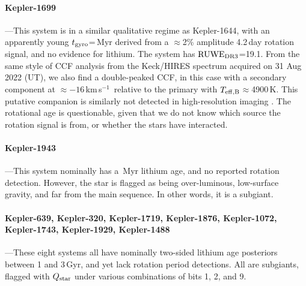 \documentclass[11pt,twocolumn,tighten]{aastex63}
\newcommand{\kms}{{km\,s$^{-1}$}}
\begin{document}
\paragraph{Kepler-1699}---This system is in a similar qualitative
regime as Kepler-1644, with an apparently young $t_{\rm
gyro}$=\kepsixteenninenine\,Myr derived from a $\approx$2\% amplitude
4.2\,day rotation signal, and no evidence for lithium.  The system has
${\rm RUWE}_{\rm DR3}$=19.1.  From the same style of CCF analysis from
the Keck/HIRES spectrum acquired on 31 Aug 2022 (UT), we also find a
double-peaked CCF, in this case with a secondary component at
$\approx$$-16$\,\kms\ relative to the primary with $T_{\rm
eff,B}$$\approx$4900\,K.  This putative companion is similarly not
detected in high-resolution imaging \citep{2017AJ....153...66Z}.  The
rotational age is questionable, given that we do not know which
source the rotation signal is from, or whether the stars have
interacted.

\paragraph{Kepler-1943}---This system nominally has a
\kepnineteenfourthree\,Myr lithium age, and no reported rotation
detection.  However, the star is flagged as being over-luminous,
low-surface gravity, and far from the main sequence.  In other words,
it is a subgiant.

\paragraph{Kepler-639, Kepler-320, Kepler-1719, Kepler-1876,
Kepler-1072, Kepler-1743, Kepler-1929, Kepler-1488}---These eight
systems all have nominally two-sided lithium age posteriors between 1
and 3\,Gyr, and yet lack rotation period detections.  All are
subgiants, flagged with $Q_{\rm star}$ under various combinations of
bits 1, 2, and 9.


%
\end{document}
